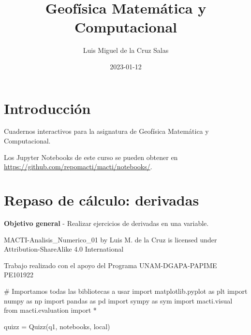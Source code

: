 \documentclass[
  letterpaper,
  DIV=11,
  numbers=noendperiod]{scrreprt}
\title{Geofísica Matemática y Computacional}
\author{Luis Miguel de la Cruz Salas}
\date{2023-01-12}
\newenvironment{Shaded}{\begin{snugshade}}{\end{snugshade}}
\newcommand{\CommentTok}[1]{\textcolor[rgb]{0.37,0.37,0.37}{#1}}
\newcommand{\ImportTok}[1]{\textcolor[rgb]{0.00,0.46,0.62}{#1}}
\newcommand{\NormalTok}[1]{\textcolor[rgb]{0.00,0.23,0.31}{#1}}
\newcommand{\OperatorTok}[1]{\textcolor[rgb]{0.37,0.37,0.37}{#1}}
\newcommand{\StringTok}[1]{\textcolor[rgb]{0.13,0.47,0.30}{#1}}
\renewcommand*\contentsname{Table of contents}
\newcommand\contentsname{Table of contents}
\begin{document}
\maketitle

\renewcommand*\contentsname{Table of contents}
{
\hypersetup{linkcolor=}
\setcounter{tocdepth}{2}
\tableofcontents
}

\chapter*{Introducción}\label{introducciuxf3n}


Cuadernos interactivos para la asignatura de Geofísica Matemática y
Computacional.

Los Jupyter Notebooks de este curso se pueden obtener en
\url{https://github.com/repomacti/macti/notebooks/}.


\chapter{Repaso de cálculo:
derivadas}\label{repaso-de-cuxe1lculo-derivadas}

\textbf{Objetivo general} - Realizar ejercicios de derivadas en una
variable.

MACTI-Analisis\_Numerico\_01 by Luis M. de la Cruz is licensed under
Attribution-ShareAlike 4.0 International

Trabajo realizado con el apoyo del Programa UNAM-DGAPA-PAPIME PE101922

\begin{Shaded}
\begin{Highlighting}[]
\CommentTok{\# Importamos todas las bibliotecas a usar}
\ImportTok{import}\NormalTok{ matplotlib.pyplot }\ImportTok{as}\NormalTok{ plt}
\ImportTok{import}\NormalTok{ numpy }\ImportTok{as}\NormalTok{ np}
\ImportTok{import}\NormalTok{ pandas }\ImportTok{as}\NormalTok{ pd}
\ImportTok{import}\NormalTok{ sympy }\ImportTok{as}\NormalTok{ sym}
\ImportTok{import}\NormalTok{ macti.visual }
\ImportTok{from}\NormalTok{ macti.evaluation }\ImportTok{import} \OperatorTok{*}
\end{Highlighting}
\end{Shaded}

\begin{Shaded}
\begin{Highlighting}[]
\NormalTok{quizz }\OperatorTok{=}\NormalTok{ Quizz(}\StringTok{\textquotesingle{}q1\textquotesingle{}}\NormalTok{, }\StringTok{\textquotesingle{}notebooks\textquotesingle{}}\NormalTok{, }\StringTok{\textquotesingle{}local\textquotesingle{}}\NormalTok{)}
\end{Highlighting}
\end{Shaded}
\end{document}
